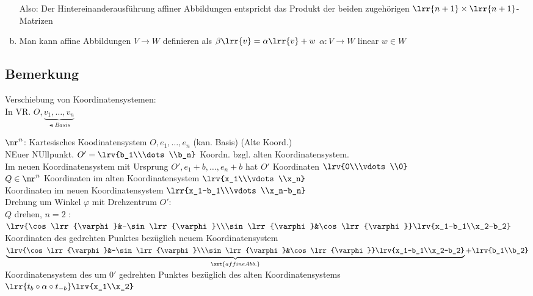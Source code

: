 \begin{enumerate}[a)]
			Also: Der Hintereinanderausführung affiner Abbildungen entspricht das Produkt der beiden zugehörigen $\lrr{n+1}\times\lrr{n+1}$-Matrizen
		\item Man kann affine Abbildungen $V\rightarrow W$ definieren als $\beta\lrr{v}=\alpha\lrr{v}+w$ $\alpha:V\rightarrow W$ linear $w\in W$
	\end{enumerate}
	
\subsection{Bemerkung}
	Verschiebung von Koordinatensystemen:\\
	In VR. $O,\underbrace{v_1,\dots,v_n}_{\smt{Basis}}$
	
	
	$\mr^n$: Kartesisches Koodinatensystem $O,e_1,\dots,e_n$ (kan. Basis) (Alte Koord.)\\
	NEuer NUllpunkt. $O'=\lrv{b_1\\\dots\\b_n}$ Koordn. bzgl. alten Koordinatensystem.\\
	Im neuen Koordinatensystem mit Ursprung $O',e_1+b,\dots,e_n+b$ hat $O'$ Koordinaten $\lrv{0\\\vdots\\0}$\\
	$Q\in\mr^n$ Koordinaten im alten Koordinatensystem $\lrv{x_1\\\vdots\\x_n}$\\
	Koordinaten im neuen Koordinatensystem $\lrr{x_1-b_1\\\vdots\\x_n-b_n}$\\
	Drehung um Winkel $\varphi$ mit Drehzentrum $O'$:\\
	$Q$ drehen, $n=2$ : $\lrv{\cos\lrr{\varphi}&-\sin\lrr{\varphi}\\\sin\lrr{\varphi}&\cos\lrr{\varphi}}\lrv{x_1-b_1\\x_2-b_2}$ Koordinaten des gedrehten Punktes bezüglich neuem Koordinatensystem\\
	$\underbrace{\lrv{\cos\lrr{\varphi}&-\sin\lrr{\varphi}\\\sin\lrr{\varphi}&\cos\lrr{\varphi}}\lrv{x_1-b_1\\x_2-b_2}}_{\smt{affine Abb.}}+\lrv{b_1\\b_2}$\\
	Koordinatensystem des um $0'$ gedrehten Punktes bezüglich des alten Koordinatensystems\\
	$\lrr{t_b\circ\alpha\circ t_{-b}}\lrv{x_1\\x_2}$